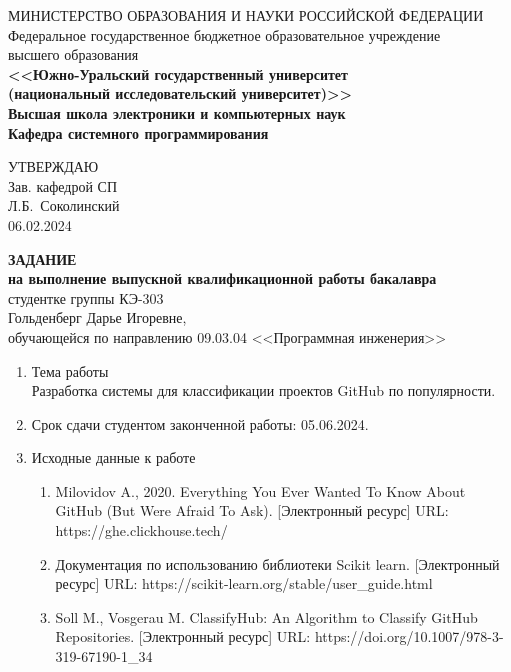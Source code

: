 \newpage
\thispagestyle{empty}

\begin{adjustwidth}{-1.5cm}{0.5cm}
\begin{linespread}{1}
\begin{center}


\small{
МИНИСТЕРСТВО ОБРАЗОВАНИЯ И НАУКИ РОССИЙСКОЙ ФЕДЕРАЦИИ\\
Федеральное государственное бюджетное образовательное учреждение\\
высшего образования\\
\textbf{<<Южно-Уральский государственный университет\\
(национальный исследовательский университет)>>\\
Высшая школа электроники и компьютерных наук\\
Кафедра системного программирования}
}



\vspace{2em}

\hfill{}
\parbox{7cm}{
УТВЕРЖДАЮ \\
Зав. кафедрой СП \\[0.5em]
\underfield{} Л.Б.~Соколинский \\[0.5em]
06.02.2024
}

\vspace{2em}

\textbf{ЗАДАНИЕ} \\
\textbf{на выполнение выпускной квалификационной работы бакалавра}\\
студентке группы КЭ-303\\
Гольденберг Дарье Игоревне,\\
обучающейся по направлению 09.03.04 <<Программная инженерия>> 

\end{center}

\vspace{2em}

{
\small
\begin{enumerate}
	\bf\item Тема работы \rm \\
	Разработка системы для классификации проектов GitHub по популярности.
	\bf\item Срок сдачи студентом законченной работы: \rm
	05.06.2024.

	\bf\item Исходные данные к работе\rm
	\begin{enumerate}%
		\raggedright
		\item Milovidov A., 2020. Everything You Ever Wanted To Know About GitHub (But Were Afraid To Ask). [Электронный ресурс] URL: https://ghe.clickhouse.tech/
        \item Документация по использованию библиотеки Scikit learn. [Электронный ресурс] URL: https://scikit-learn.org/stable/user\_guide.html 
        \item Soll M., Vosgerau M. ClassifyHub: An Algorithm to Classify GitHub Repositories. [Электронный ресурс] URL: https://doi.org/10.1007/978-3-319-67190-1\_34
	\end{enumerate}


\end{enumerate}}
\end{linespread}
\end{adjustwidth}
